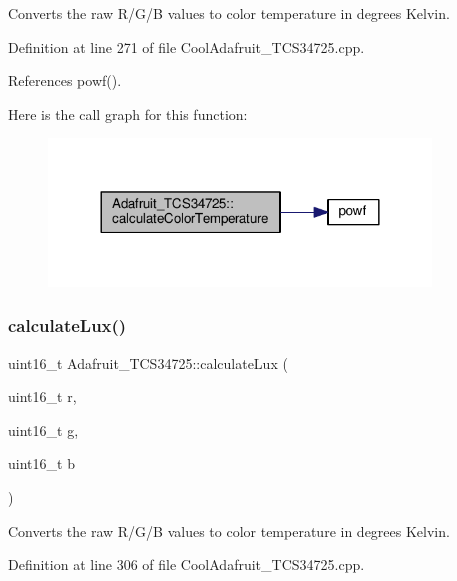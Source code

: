 Converts the raw R/\+G/B values to color temperature in degrees Kelvin. 



Definition at line 271 of file Cool\+Adafruit\+\_\+\+T\+C\+S34725.\+cpp.



References powf().

Here is the call graph for this function\+:\nopagebreak
\begin{figure}[H]
\begin{center}
\leavevmode
\includegraphics[width=288pt]{df/d54/class_adafruit___t_c_s34725_a9c6c7ab8a84a47a65ff04a125bcfee92_cgraph}
\end{center}
\end{figure}
\mbox{\label{class_adafruit___t_c_s34725_a10b9be546ee3bdf04e0380161aad589b}} 
\subsubsection{\texorpdfstring{calculate\+Lux()}{calculateLux()}}
{\footnotesize\ttfamily uint16\+\_\+t Adafruit\+\_\+\+T\+C\+S34725\+::calculate\+Lux (\begin{DoxyParamCaption}\item[{uint16\+\_\+t}]{r,  }\item[{uint16\+\_\+t}]{g,  }\item[{uint16\+\_\+t}]{b }\end{DoxyParamCaption})}



Converts the raw R/\+G/B values to color temperature in degrees Kelvin. 



Definition at line 306 of file Cool\+Adafruit\+\_\+\+T\+C\+S34725.\+cpp.

\mbox{\label{class_adafruit___t_c_s34725_aa526557ad0d76b3b6e31e6197de583e6}} 
